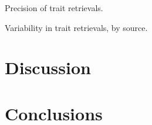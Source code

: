 \documentclass[draft]{agujournal2019}
\begin{document}
Precision of trait retrievals.

Variability in trait retrievals, by source.

\section{Discussion}\label{sec:discussion}

\section{Conclusions}





%
%
%
%
%
%
%
%
%
%
\end{document}

